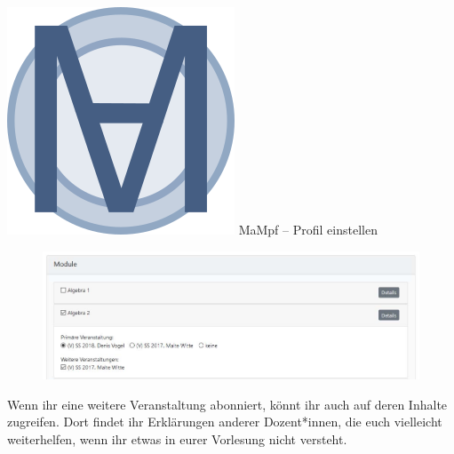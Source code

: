 \begin{frame}{\includegraphics[scale=0.072]{images/mampf.png} MaMpf -- Profil einstellen}
{            \begin{figure}
                  \centering
                  \includegraphics[scale=0.3]{images/mampf25.jpg}
            \end{figure}
            Wenn ihr eine weitere Veranstaltung abonniert, könnt ihr auch auf deren
            Inhalte zugreifen.
            Dort findet ihr Erklärungen anderer Dozent*innen, die euch vielleicht
            weiterhelfen, wenn ihr etwas in eurer Vorlesung nicht versteht.
      }
\end{frame}

